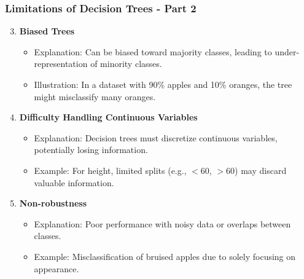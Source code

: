 \documentclass[aspectratio=169]{beamer}
\begin{document}
\begin{frame}[fragile]
    \frametitle{Limitations of Decision Trees - Part 2}
    \begin{enumerate}
        \setcounter{enumi}{2}
        \item \textbf{Biased Trees}
        \begin{itemize}
            \item Explanation: Can be biased toward majority classes, leading to under-representation of minority classes.
            \item Illustration: In a dataset with 90\% apples and 10\% oranges, the tree might misclassify many oranges.
        \end{itemize}

        \item \textbf{Difficulty Handling Continuous Variables}
        \begin{itemize}
            \item Explanation: Decision trees must discretize continuous variables, potentially losing information.
            \item Example: For height, limited splits (e.g., $<60$, $>60$) may discard valuable information.
        \end{itemize}

        \item \textbf{Non-robustness}
        \begin{itemize}
            \item Explanation: Poor performance with noisy data or overlaps between classes.
            \item Example: Misclassification of bruised apples due to solely focusing on appearance.
        \end{itemize}
    \end{enumerate}
\end{frame}
\end{document}
